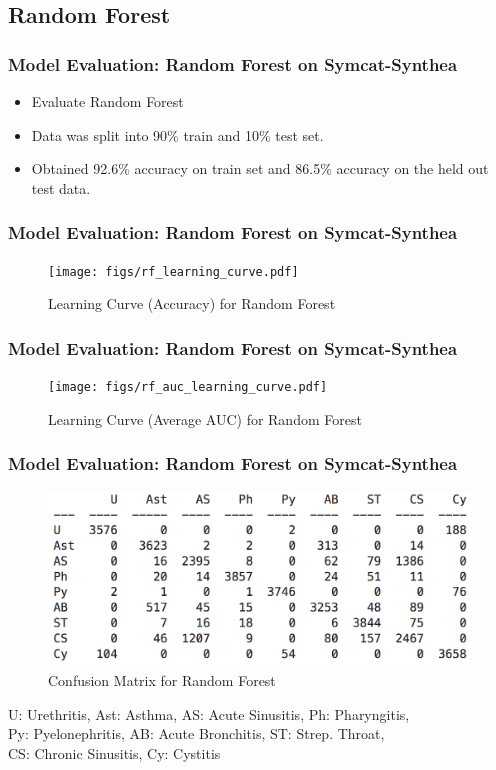 \documentclass{beamer}
\begin{document}
		\subsection{Random Forest}
		\begin{frame}
			\frametitle{Model Evaluation: Random Forest on Symcat-Synthea}
			\begin{itemize}
				\item Evaluate Random Forest 
				\item Data was split into 90\% train and 10\% test set.
				\item Obtained 92.6\% accuracy on train set and 86.5\% accuracy on the held out test data.
			\end{itemize}
		\end{frame}
	
		\begin{frame}
			\frametitle{Model Evaluation: Random Forest on Symcat-Synthea}
			\begin{figure}
			\texttt{[image: figs/rf\_learning\_curve.pdf]}
			\caption{Learning Curve (Accuracy) for Random Forest}
			\end{figure}
		\end{frame}
	
		\begin{frame}
			\frametitle{Model Evaluation: Random Forest on Symcat-Synthea}
			\begin{figure}
				\texttt{[image: figs/rf\_auc\_learning\_curve.pdf]}
				\caption{Learning Curve (Average AUC) for Random Forest}
			\end{figure}
		\end{frame}
	
		\begin{frame}
		\frametitle{Model Evaluation: Random Forest  on Symcat-Synthea}
		\begin{figure}
			\includegraphics[width=\linewidth]{figs/rf_confusion_matrix.png}
			\caption{Confusion Matrix for Random Forest}
		\end{figure}
		
		U: Urethritis,  Ast: Asthma,  AS: Acute Sinusitis,  Ph: Pharyngitis, \\
		Py: Pyelonephritis,  AB: Acute Bronchitis,  ST: Strep. Throat,\\
		CS: Chronic Sinusitis,  Cy: Cystitis
	\end{frame}
	
\end{document}

